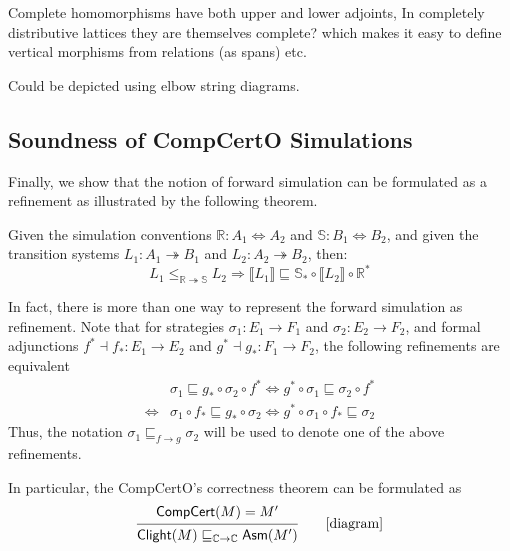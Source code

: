 \documentclass[sigplan,10pt,authordraft]{acmart}
\begin{document}
Complete homomorphisms have both upper and lower adjoints,
In completely distributive lattices
they are themselves complete?
which makes it easy to define vertical morphisms
from relations (as spans) etc.

Could be depicted using elbow string diagrams.




\subsection{Soundness of CompCertO Simulations}

Finally, we show that the notion of forward simulation can be formulated as a
refinement as illustrated by the following theorem.
\begin{theorem}
  Given the simulation conventions $\mathbb{R} : A_1 \Leftrightarrow A_2$ and
  $\mathbb{S} : B_1 \Leftrightarrow B_2$, and given the transition systems
  $L_1: A_1 \twoheadrightarrow B_1$ and
  $L_2: A_2 \twoheadrightarrow B_2$, then:
  \[
    L_1 \le_{\mathbb{R} \twoheadrightarrow \mathbb{S}} L_2 \Rightarrow
    \llbracket L_1 \rrbracket \sqsubseteq
    \mathbb{S}_* \circ \llbracket L_2 \rrbracket \circ \mathbb{R}^*
  \]
\end{theorem}

In fact, there is more than one way to
represent the forward simulation as refinement.
Note that for strategies $\sigma_1: E_1 \rightarrow F_1$
and $\sigma_2: E_2 \rightarrow F_2$,
and formal adjunctions $f^* \dashv f_*: E_1 \rightarrow E_2$
and $g^* \dashv g_*: F_1 \rightarrow F_2$,
the following refinements are equivalent
\begin{align*}
  & \sigma_1 \sqsubseteq g_* \circ \sigma_2 \circ f^*
  \Leftrightarrow
  g^* \circ \sigma_1 \sqsubseteq \sigma_2 \circ f^*\\
  \Leftrightarrow &
  \sigma_1 \circ f_* \sqsubseteq g_* \circ \sigma_2
  \Leftrightarrow
  g^* \circ \sigma_1 \circ f_* \sqsubseteq \sigma_2
\end{align*}
Thus, the notation $\sigma_1 \sqsubseteq_{f \rightarrow g} \sigma_2$
will be used to denote one of the above refinements.

In particular, the CompCertO's correctness theorem can be formulated as
\[
  \begin{prooftree}
    \hypo{\kw{CompCert}(M) = M'}
    \infer1{
      \kw{Clight}(M)
      \sqsubseteq_{\mathbb{C} \rightarrow \mathbb{C}}
      \kw{Asm}(M')}
  \end{prooftree}
  \qquad
  \mbox{[diagram]}
\]
\end{document}
